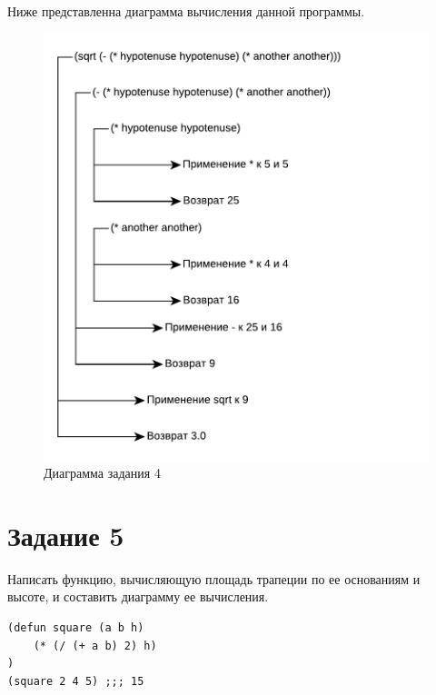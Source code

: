 Ниже представленна диаграмма вычисления данной программы.
\begin{figure}[H]
    \centering
    \includegraphics[scale=0.85]{data/pdf/task_1.pdf}
    \caption{Диаграмма задания 4}
\end{figure}

\section{Задание \No{}5}

Написать функцию, вычисляющую площадь трапеции по ее основаниям и
высоте, и составить диаграмму ее вычисления.

\begin{lstlisting}
(defun square (a b h)
    (* (/ (+ a b) 2) h)
)
(square 2 4 5) ;;; 15
\end{lstlisting}

